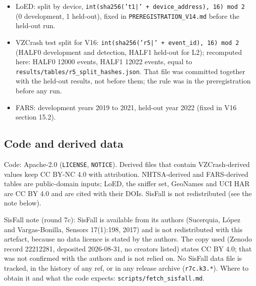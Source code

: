\begin{itemize}
\item LoED: split by device, \texttt{int(sha256('t1|' + device\_address), 16) mod 2} (0 development, 1 held-out), fixed in \texttt{PREREGISTRATION\_V14.md} before the held-out run.
\item VZCrash test split for V16: \texttt{int(sha256('r5|' + event\_id), 16) mod 2} (HALF0 development and detection, HALF1 held-out for L2); recomputed here: HALF0 12000 events, HALF1 12022 events, equal to \texttt{results/tables/r5\_split\_hashes.json}. That file was committed together with the held-out results, not before them; the rule was in the preregistration before any run.
\item FARS: development years 2019 to 2021, held-out year 2022 (fixed in V16 section 15.2).
\end{itemize}

\subsection*{Code and derived data}

Code: Apache-2.0 (\texttt{LICENSE}, \texttt{NOTICE}). Derived files that contain VZCrash-derived values keep CC BY-NC 4.0 with attribution. NHTSA-derived and FARS-derived tables are public-domain inputs; LoED, the sniffer set, GeoNames and UCI HAR are CC BY 4.0 and are cited with their DOIs. SisFall is not redistributed (see the note below).

SisFall note (round 7c): SisFall is available from its authors (Sucerquia, L\'opez and Vargas-Bonilla, Sensors 17(1):198, 2017) and is not redistributed with this artefact, because no data licence is stated by the authors. The copy used (Zenodo record 22212281, deposited 2026-08-31, no creators listed) states CC BY 4.0; that was not confirmed with the authors and is not relied on. No SisFall data file is tracked, in the history of any ref, or in any release archive (\texttt{r7c.k3.*}). Where to obtain it and what the code expects: \texttt{scripts/fetch\_sisfall.md}.

